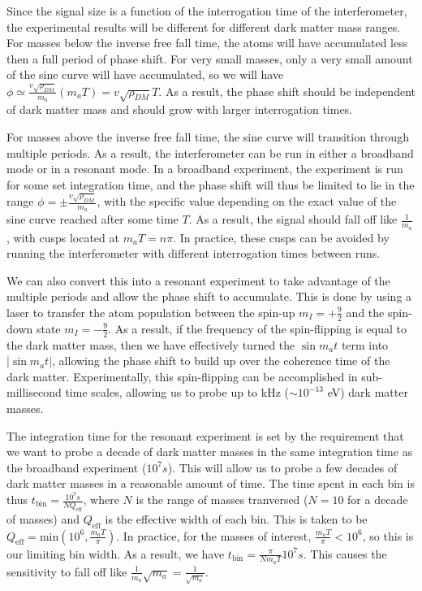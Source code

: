 \documentclass[aps,prd,final,letterpaper]{revtex4}
\begin{document}
Since the signal size is a function of the interrogation time of the interferometer, the experimental results will be different for different dark matter mass ranges. For masses below the inverse free fall time, the atoms will have accumulated less then a full period of phase shift. For very small masses, only a very small amount of the sine curve will have accumulated, so we will have $\phi \simeq \frac{v\sqrt{\rho_{DM}}}{m_a}(m_aT) = v\sqrt{\rho_{DM}}T$. As a result, the phase shift should be independent of dark matter mass and should grow with larger interrogation times.

For masses above the inverse free fall time, the sine curve will transition through multiple periods. As a result, the interferometer can be run in either a broadband mode or in a resonant mode. In a broadband experiment, the experiment is run for some set integration time, and the phase shift will thus be limited to lie in the range $\phi = \pm\frac{v\sqrt{\rho_{DM}}}{m_a}$, with the specific value depending on the exact value of the sine curve reached after some time $T$. As a result, the signal should fall off like $\frac{1}{m_a}$, with cusps located at $m_a T = n\pi$. In practice, these cusps can be avoided by running the interferometer with different interrogation times between runs.

We can also convert this into a resonant experiment to take advantage of the multiple periods and allow the phase shift to accumulate. This is done by using a laser to transfer the atom population between the spin-up $m_I = +\frac{9}{2}$ and the spin-down state $m_I = -\frac{9}{2}$. As a result, if the frequency of the spin-flipping is equal to the dark matter mass, then we have effectively turned the $\sin{m_a t}$ term into $|\sin{m_a t}|$, allowing the phase shift to build up over the coherence time of the dark matter. Experimentally, this spin-flipping can be accomplished in sub-millisecond time scales, allowing us to probe up to kHz ($\sim 10^{-13}$ eV) dark matter masses. 

The integration time for the resonant experiment is set by the requirement that we want to probe a decade of dark matter masses in the same integration time as the broadband experiment ($10^7 s$). This will allow us to probe a few decades of dark matter masses in a reasonable amount of time. The time spent in each bin is thus $t_{\mathrm{bin}} = \frac{10^7 s}{N Q_\mathrm{eff}}$, where $N$ is the range of masses tranversed ($N = 10$ for a decade of masses) and $Q_{\mathrm{eff}}$ is the effective width of each bin. This is taken to be $Q_{\mathrm{eff}} = \mathrm{min}\left(10^6, \frac{m_a T}{\pi}\right)$. In practice, for the masses of interest, $\frac{m_a T}{\pi} < 10^6$, so this is our limiting bin width. As a result, we have $t_{\mathrm{bin}} = \frac{\pi}{N m_a T} 10^7 s$. This causes the sensitivity to fall off like $\frac{1}{m_a}\sqrt{m_a} = \frac{1}{\sqrt{m_a}}$. 
\end{document}
